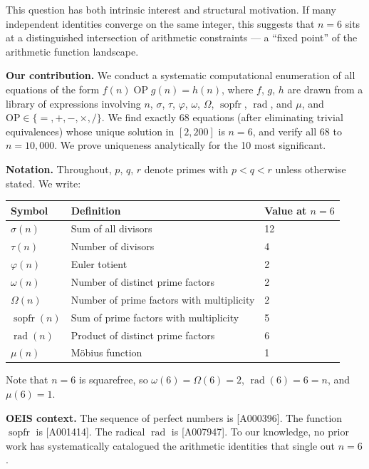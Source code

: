\documentclass{article}
\newcommand{\rad}{\operatorname{rad}}
\newcommand{\sopfr}{\operatorname{sopfr}}
\begin{document}
This question has both intrinsic interest and structural motivation. If many independent identities converge on the same integer, this suggests that $n = 6$ sits at a distinguished intersection of arithmetic constraints --- a ``fixed point'' of the arithmetic function landscape.

\textbf{Our contribution.} We conduct a systematic computational enumeration of all equations of the form $f(n) \; \mathrm{OP} \; g(n) = h(n)$, where $f$, $g$, $h$ are drawn from a library of expressions involving $n$, $\sigma$, $\tau$, $\varphi$, $\omega$, $\Omega$, $\sopfr$, $\rad$, and $\mu$, and $\mathrm{OP} \in \{=, +, -, \times, /\}$. We find exactly 68 equations (after eliminating trivial equivalences) whose unique solution in $[2, 200]$ is $n = 6$, and verify all 68 to $n = 10{,}000$. We prove uniqueness analytically for the 10 most significant.

\textbf{Notation.} Throughout, $p$, $q$, $r$ denote primes with $p < q < r$ unless otherwise stated. We write:

\begin{center}
\begin{tabular}{lll}
\toprule
Symbol & Definition & Value at $n = 6$ \\
\midrule
$\sigma(n)$ & Sum of all divisors & 12 \\
$\tau(n)$ & Number of divisors & 4 \\
$\varphi(n)$ & Euler totient & 2 \\
$\omega(n)$ & Number of distinct prime factors & 2 \\
$\Omega(n)$ & Number of prime factors with multiplicity & 2 \\
$\sopfr(n)$ & Sum of prime factors with multiplicity & 5 \\
$\rad(n)$ & Product of distinct prime factors & 6 \\
$\mu(n)$ & M\"obius function & 1 \\
\bottomrule
\end{tabular}
\end{center}

Note that $n = 6$ is squarefree, so $\omega(6) = \Omega(6) = 2$, $\rad(6) = 6 = n$, and $\mu(6) = 1$.

\textbf{OEIS context.} The sequence of perfect numbers is \textsf{[A000396]}. The function $\sopfr$ is \textsf{[A001414]}. The radical $\rad$ is \textsf{[A007947]}. To our knowledge, no prior work has systematically catalogued the arithmetic identities that single out $n = 6$.
\end{document}
